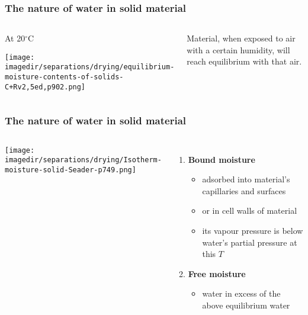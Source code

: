 \begin{frame}\frametitle{The nature of water in solid material}
	\begin{columns}[c]
			\begin{center}
				At 20$^\circ\text{C}$

				\texttt{[image: \\imagedir/separations/drying/equilibrium-moisture-contents-of-solids-C+Rv2,5ed,p902.png]}
			\end{center}
			\vspace{-12pt}
			Material, when exposed to air with a certain humidity, will reach equilibrium with that air.
			\vspace{3cm}
	\end{columns}
\end{frame}

\begin{frame}\frametitle{The nature of water in solid material}
	\begin{columns}[c]
			\begin{center}
				\texttt{[image: \\imagedir/separations/drying/Isotherm-moisture-solid-Seader-p749.png]}
			\end{center}

			\begin{enumerate}
				\item	\textbf{Bound moisture}
				\begin{itemize}
					\item	adsorbed into material's capillaries and surfaces
					\item	or in cell walls of material
					\item	its vapour pressure is below water's partial pressure at this $T$
				\end{itemize}
				\item	\textbf{Free moisture}
				\begin{itemize}
					\item	water in excess of the above equilibrium water
				\end{itemize}
			\end{enumerate}
			\vspace{3cm}
	\end{columns}
\end{frame}


